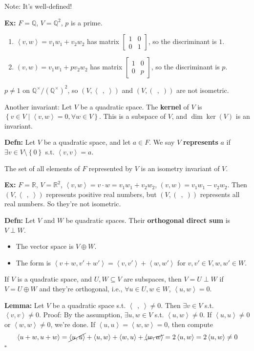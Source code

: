 \documentclass[10pt,letterpaper]{article}
\newcommand{\n}{\hfill\break}
\newcommand{\up}{\vspace{-\baselineskip}}
\newcommand{\hangblock}[2]{\par\noindent\settowidth{\hangindent}{\textbf{#1: }}\textbf{#1: }\!\!\!#2}
\newcommand{\lemma}[1]{\hangblock{Lemma}{#1}}
\newcommand{\defn}[1]{\hangblock{Defn}{#1}}
\newcommand{\ex}[1]{\hangblock{Ex}{#1}}
\newcommand{\proven}{\;$\square$\n}
\newcommand{\set}[1]{\left\{#1\right\}}
\newcommand{\rationals}{\mathbb{Q}}
\newcommand{\Q}{\rationals}
\newcommand{\reals}{\mathbb{R}}
\newcommand{\R}{\reals}
\newcommand{\cut}{\setminus}
\newcommand{\iprod}[1]{\left<#1\right>}
\newcommand{\giprod}{\iprod{\;\,,\;}}
\newcommand{\smallBMatrix}[1]{\brack{\begin{smallmatrix}#1\end{smallmatrix}}}
\newcommand{\st}{s.t.}
\renewcommand{\brack}[1]{\left[#1\right]}
\begin{document}
\par\noindent
Note: It's well-defined!\n

\ex{
	$F=\Q$, $V=\Q^{2}$, $p$ is a prime.
	\begin{enumerate}[leftmargin=4\parindent]
		\item $\iprod{v,w}=v_{1}w_{1}+v_{2}w_{2}$ has matrix $\smallBMatrix{1 & 0\\ 0 & 1}$, so the discriminant is $1$.
		\item $(v,w)=v_{1}w_{1}+pv_{2}w_{2}$ has matrix $\smallBMatrix{1 & 0\\ 0 & p}$, so the discriminant is $p$.
	\end{enumerate}\up\n
}

\par\noindent
$p\ne{}1$ on $\Q^{\times}/(\Q^{\times})^{2}$, so $(V,\giprod)$ and $(V,(\;\,,\;))$ are not isometric.\n

\par\noindent
Another invariant: Let $V$ be a quadratic space. The \textbf{kernel} of $V$ is $\set{v\in{}V\mid{}\iprod{v,w}=0,\forall{}w\in{}V}$. This is a subspace of $V$, and $\dim\ker(V)$ is an invariant.\n

\defn{
	Let $V$ be a quadratic space, and let $a\in{}F$. We say $V$ \textbf{represents} $a$ if $\exists{}v\in{}V\cut\set{0}$ \st{} $\iprod{v,v}=a$.\n
}
The set of all elements of $F$ represented by $V$ is an isometry invariant of $V$.\n

\ex{
	$F=\R$, $V=\R^{2}$, $\iprod{v,w}=v\cdot{}w=v_{1}w_{1}+v_{2}w_{2}$, $(v,w)=v_{1}w_{1}-v_{2}w_{2}$. Then $(V,\giprod)$ represents positive real numbers, but $(V,(\;\,,\;))$ represents all real numbers. So they're not isometric.\n
}

\defn{
	Let $V$ and $W$ be quadratic spaces. Their \textbf{orthogonal direct sum} is $V\perp{}W$.
	\begin{itemize}[topsep=0pt, leftmargin=4\parindent]
		\item The vector space is $V\oplus{}W$.
		\item The form is $\iprod{v+w,v'+w'}=\iprod{v,v'}+\iprod{w,w'}$ for $v,v'\in{}V,w,w'\in{}W$.
	\end{itemize}\up\n
}

\par\noindent
If $V$ is a quadratic space, and $U,W\subseteq{}V$ are subspaces, then $V=U\perp{}W$ if $V=U\oplus{}W$ and they're orthogonal, i.e., $\forall{}u\in{}U,w\in{}W$, $\iprod{u,w}=0$.\n

\lemma{
	Let $V$ be a quadratic space \st{} $\giprod\ne{}0$. Then $\exists{}v\in{}V$ \st{} $\iprod{v,v}\ne{}0$.\n
	Proof: By the assumption, $\exists{}u,w\in{}V$ \st{} $\iprod{u,w}\ne{}0$. If $\iprod{u,u}\ne{}0$ or $\iprod{w,w}\ne{}0$, we're done. If $\iprod{u,u}=\iprod{w,w}=0$, then compute
	\[
		\iprod{u+w,u+w}=\cancel{\iprod{u,u}}+\iprod{u,w}+\iprod{w,u}+\cancel{\iprod{w,w}}=2\iprod{u,w}=2\iprod{u,w}\ne{}0
	\]
	\proven
}
\end{document}
